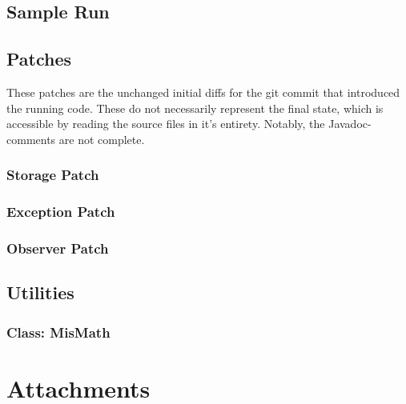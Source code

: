 \documentclass[a4paper]{scrreprt}
\begin{document}
\section{Sample Run}
\label{sec:samplerun}



\section{Patches}
These patches are the unchanged initial diffs for the git commit that introduced the running code. These do not necessarily represent the final state, which is accessible by reading the source files in it's entirety. Notably, the Javadoc-comments are not complete.

\subsection{Storage Patch}
\label{subsec:storagepatch}



\subsection{Exception Patch}
\label{subsec:exceptionpatch}




\subsection{Observer Patch}
\label{subsec:observerpatch}



\section{Utilities}

\subsection{Class: MisMath}
\label{subsec:mismath.java}


\chapter{Attachments}
\end{document}
